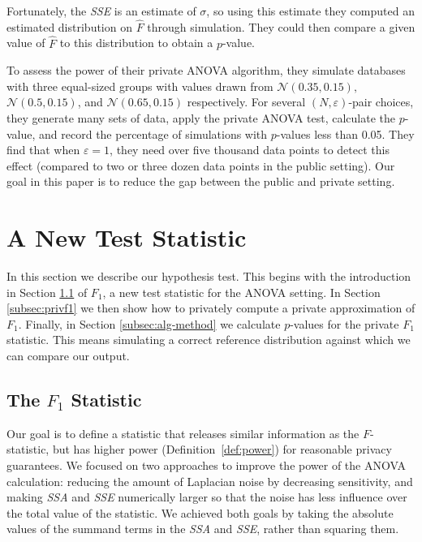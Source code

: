 \documentclass[USenglish,oneside]{article}
\newcounter{ag}
\newcounter{ab}
\newcounter{ar}
\newcounter{igh}
\newcounter{ms}
\newcommand{\dbsize}{\ensuremath{N}\xspace}
\newcommand{\eps}{\ensuremath{\varepsilon}\xspace}
\newcommand{\normal}{\ensuremath{\mathcal{N}}}
\newcommand{\sse}{\textit{SSE}\xspace}
\newcommand{\ssa}{\textit{SSA}\xspace}
\begin{document}
Fortunately, the \sse is an estimate of $\sigma$, so using this estimate they computed an estimated distribution on $\widehat{F}$ through simulation. They could then compare a given value of $\widehat{F}$ to this distribution to obtain a $p$-value.

To assess the power of their private ANOVA algorithm, they simulate databases with three equal-sized groups with values drawn from $\normal(0.35, 0.15),$ $ \normal(0.5, 0.15)$, and $\normal(0.65, 0.15)$ respectively. For several $(\dbsize,\eps)$-pair choices, they generate many sets of data, apply the private ANOVA test, calculate the $p$-value, and record the percentage of simulations with $p$-values less than 0.05. They find that when $\eps = 1$, they need over five thousand data points to detect this effect (compared to two or three dozen data points in the public setting).  Our goal in this paper is to reduce the gap between the public and private setting.



\section{A New Test Statistic}\label{sec:f1}

In this section we describe our hypothesis test.  This begins with the introduction in Section \ref{subsec:f1def} of $F_1$, a new test statistic for the ANOVA setting.  In Section \ref{subsec:privf1} we then show how to privately compute a private approximation of $F_1$.  Finally, in Section \ref{subsec:alg-method} we calculate $p$-values for the private $F_1$ statistic.  This means simulating a correct reference distribution against which we can compare our output.


\subsection{The $F_1$ Statistic}\label{subsec:f1def}


Our goal is to define a statistic that releases similar information as the $F$-statistic, but has higher power (Definition~\ref{def:power}) for reasonable privacy guarantees.  We focused on two approaches to improve the power of the ANOVA calculation: reducing the amount of Laplacian noise by decreasing sensitivity, and making \ssa and \sse numerically larger so that the noise has less influence over the total value of the statistic.  We achieved both goals by taking the absolute values of the summand terms in the \ssa and \sse, rather than squaring them. 
\end{document}
